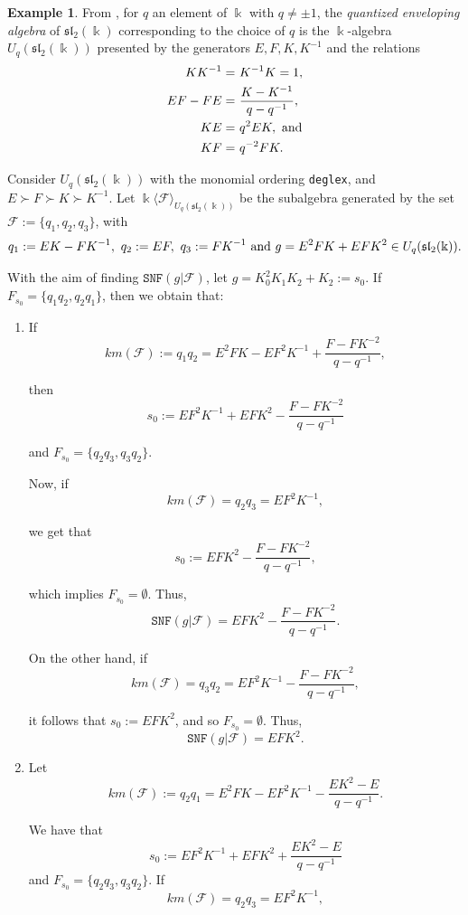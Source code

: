 \documentclass{amsart}
\theoremstyle{definition}
\newtheorem{example}[theorem]{Example}
\theoremstyle{remark}
\numberwithin{equation}{section}
\begin{document}
\begin{example}\label{examplered3}
From \cite[p. 41]{GoodearlWarfield2004}, for $q$ an element of $\Bbbk$ with $q\neq \pm 1$, the {\em quantized enveloping algebra} of $\mathfrak{sl}_2(\Bbbk)$ corresponding to the choice of $q$ is the $\Bbbk$-algebra $U_q(\mathfrak{sl}_2(\Bbbk))$ presented by the generators $E, F, K, K^{-1}$ and the relations 
\begin{align*}
	KK^{-1} = &\ K^{-1}K = 1,\\ 
	EF - FE = &\ \frac{K-K^{-1}}{q-q^{-1}}, \\ KE = &\ q^{2}EK, \ {\rm and}\\ KF = &\ q^{-2}FK.
\end{align*}

Consider $U_q(\mathfrak{sl}_2(\Bbbk))$ with the monomial ordering \texttt{deglex}, and $E\succ F\succ K\succ K^{-1}.$ Let $\Bbbk\langle \mathcal{F}\rangle_{U_q(\mathfrak{sl}_2(\Bbbk))}$ be the subalgebra generated by the set $\mathcal{F}:=\{q_1, q_2, q_3\}$, with 
$$
q_1:=E K-F K^{-1},\ q_2:= EF,\ q_3:= F K^{-1} \ {\rm and} \ g = E^2 F K+E F K^2\in U_q(\mathfrak{sl}_2(\Bbbk)).
$$

With the aim of finding $\texttt{SNF}(g | \mathcal{F})$, let $g=K_0^2 K_1 K_2+K_2:=s_0$. If $F_{s_0}=\{q_1q_2,q_2q_1\}$, then we obtain that:
\begin{enumerate}
\item [\rm (i)] If 
$$
km(\mathcal{F}) := q_1q_2=E^2 F K-E F^2 K^{-1}+\frac{F-F K^{-2}}{q-q^{-1}}, 
$$

then 
$$
s_0:=E F^2 K^{-1}+E F K^2-\frac{F-F K^{-2}}{q-q^{-1}}
$$ 

and $F_{s_0}=\{q_2q_3,q_3q_2\}.$ 

Now, if 
$$
km(\mathcal{F})=q_2q_3=E F^2 K^{-1},
$$

we get that 
$$
s_0:=E F K^2-\frac{F-F K^{-2}}{q-q^{-1}},
$$

which implies $F_{s_0}=\emptyset.$ Thus, 
$$
\texttt{SNF}(g |\mathcal{F} )= E F K^2-\frac{F-F K^{-2}}{q-q^{-1}}.
$$ 

On the other hand, if $$
km(\mathcal{F})=q_3q_2=E F^2 K^{-1}-\frac{F-F K^{-2}}{q-q^{-1}}, 
$$

it follows that $s_0:=E F K^2$, and so $F_{s_0}=\emptyset$. Thus, 
$$
\texttt{SNF}(g |\mathcal{F} )= E F K^2.
$$

\item [\rm (ii)] Let 
$$
km(\mathcal{F}):=q_2q_1=E^2 F K-E F^2 K^{-1}-\frac{EK^2-E}{q-q^{-1}}.
$$

We have that 
$$
s_0:=E F^2 K^{-1}+E F K^2+\frac{EK^2-E}{q-q^{-1}}
$$ and $F_{s_0}=\{q_2q_3,q_3q_2\}$. If 
$$
km(\mathcal{F})=q_2q_3=E F^2 K^{-1}, 
$$ 


\end{enumerate}
\end{example}
\end{document}
